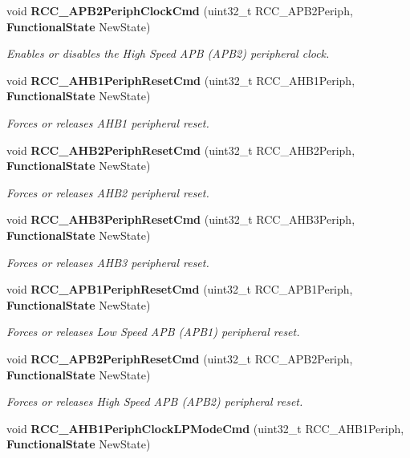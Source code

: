 \begin{DoxyCompactItemize}
void \textbf{ R\+C\+C\+\_\+\+A\+P\+B2\+Periph\+Clock\+Cmd} (uint32\+\_\+t R\+C\+C\+\_\+\+A\+P\+B2\+Periph, \textbf{ Functional\+State} New\+State)
\begin{DoxyCompactList}\small\item\em Enables or disables the High Speed A\+PB (A\+P\+B2) peripheral clock. \end{DoxyCompactList}\item 
void \textbf{ R\+C\+C\+\_\+\+A\+H\+B1\+Periph\+Reset\+Cmd} (uint32\+\_\+t R\+C\+C\+\_\+\+A\+H\+B1\+Periph, \textbf{ Functional\+State} New\+State)
\begin{DoxyCompactList}\small\item\em Forces or releases A\+H\+B1 peripheral reset. \end{DoxyCompactList}\item 
void \textbf{ R\+C\+C\+\_\+\+A\+H\+B2\+Periph\+Reset\+Cmd} (uint32\+\_\+t R\+C\+C\+\_\+\+A\+H\+B2\+Periph, \textbf{ Functional\+State} New\+State)
\begin{DoxyCompactList}\small\item\em Forces or releases A\+H\+B2 peripheral reset. \end{DoxyCompactList}\item 
void \textbf{ R\+C\+C\+\_\+\+A\+H\+B3\+Periph\+Reset\+Cmd} (uint32\+\_\+t R\+C\+C\+\_\+\+A\+H\+B3\+Periph, \textbf{ Functional\+State} New\+State)
\begin{DoxyCompactList}\small\item\em Forces or releases A\+H\+B3 peripheral reset. \end{DoxyCompactList}\item 
void \textbf{ R\+C\+C\+\_\+\+A\+P\+B1\+Periph\+Reset\+Cmd} (uint32\+\_\+t R\+C\+C\+\_\+\+A\+P\+B1\+Periph, \textbf{ Functional\+State} New\+State)
\begin{DoxyCompactList}\small\item\em Forces or releases Low Speed A\+PB (A\+P\+B1) peripheral reset. \end{DoxyCompactList}\item 
void \textbf{ R\+C\+C\+\_\+\+A\+P\+B2\+Periph\+Reset\+Cmd} (uint32\+\_\+t R\+C\+C\+\_\+\+A\+P\+B2\+Periph, \textbf{ Functional\+State} New\+State)
\begin{DoxyCompactList}\small\item\em Forces or releases High Speed A\+PB (A\+P\+B2) peripheral reset. \end{DoxyCompactList}\item 
void \textbf{ R\+C\+C\+\_\+\+A\+H\+B1\+Periph\+Clock\+L\+P\+Mode\+Cmd} (uint32\+\_\+t R\+C\+C\+\_\+\+A\+H\+B1\+Periph, \textbf{ Functional\+State} New\+State)

\end{DoxyCompactItemize}
